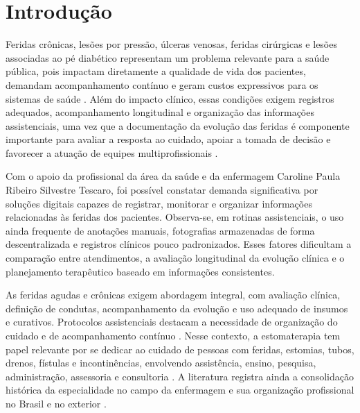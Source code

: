 \documentclass[
    12pt,
    oneside,
    a4paper,
    chapter=TITLE,
    brazil,
    sumario=tradicional,
    hidelinks
]{abntex2}
\begin{document}
\tableofcontents*
\cleardoublepage

\textual
\pagestyle{semcabecalho}

\chapter{Introdução}

Feridas crônicas, lesões por pressão, úlceras venosas, feridas cirúrgicas e lesões associadas ao pé diabético representam um problema relevante para a saúde pública, pois impactam diretamente a qualidade de vida dos pacientes, demandam acompanhamento contínuo e geram custos expressivos para os sistemas de saúde \cite{olsson2019,sen2019}. Além do impacto clínico, essas condições exigem registros adequados, acompanhamento longitudinal e organização das informações assistenciais, uma vez que a documentação da evolução das feridas é componente importante para avaliar a resposta ao cuidado, apoiar a tomada de decisão e favorecer a atuação de equipes multiprofissionais \cite{batesjensen2019,alves2015}.

Com o apoio da profissional da área da saúde e da enfermagem Caroline Paula Ribeiro Silvestre Tescaro, foi possível constatar demanda significativa por soluções digitais capazes de registrar, monitorar e organizar informações relacionadas às feridas dos pacientes. Observa-se, em rotinas assistenciais, o uso ainda frequente de anotações manuais, fotografias armazenadas de forma descentralizada e registros clínicos pouco padronizados. Esses fatores dificultam a comparação entre atendimentos, a avaliação longitudinal da evolução clínica e o planejamento terapêutico baseado em informações consistentes.

As feridas agudas e crônicas exigem abordagem integral, com avaliação clínica, definição de condutas, acompanhamento da evolução e uso adequado de insumos e curativos. Protocolos assistenciais destacam a necessidade de organização do cuidado e de acompanhamento contínuo \cite{florianopolis2008}. Nesse contexto, a estomaterapia tem papel relevante por se dedicar ao cuidado de pessoas com feridas, estomias, tubos, drenos, fístulas e incontinências, envolvendo assistência, ensino, pesquisa, administração, assessoria e consultoria \cite{paczek2024}. A literatura registra ainda a consolidação histórica da especialidade no campo da enfermagem e sua organização profissional no Brasil e no exterior \cite{paula2003,yamada2003,wcet2026}.
\end{document}
